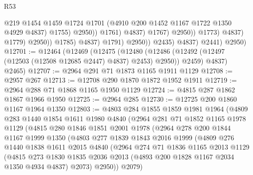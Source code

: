 \begin{lexlean}{R53}
\begin{coremodule}
                                                @219
                                                @1454
                                                @1459
                                                @1724
                                                @1701
                                                (@4910 @200 @1452 @1167 @1722 @1350 @4929 @4837)
                                                @1755)
                                              @2950))
                                          @1761)
                                        @4837)
                                      @1767)
                                    @2950))
                                @1773)
                              @4837)
                            @1779)
                          @2950))
                      @1785)
                    @4837)
                  @1791)
                @2950))
            @2435)
          @4837)
        @2441)
      @2950)
@12701 := @12464
    (@12469
      (@12475
        (@12480 (@12486 (@12492 (@12497 (@12503 (@12508 @12685 @2447) @4837) @2453) @2950)) @2459)
        @4837)
      @2465)
@12707 := @2964 @291 @71 @1873 @1165 @1911 @1129
@12708 := @2957 @267
@12713 := @12708 @290 @1870 @1872 @1952 @1911
@12719 := @2964 @288 @71 @1868 @1165 @1950 @1129
@12724 := @4815 @287 @1862 @1867 @1966 @1950
@12725 := @2964 @285
@12730 := @12725 @200 @1860 @1167 @1964 @1350
@12803 := @4803
    @284
    @1855
    @1859
    @1981
    @1964
    (@4809
      @283
      @1440
      @1854
      @1611
      @1980
      @4840
      (@2964
        @281
        @71
        @1852
        @1165
        @1978
        @1129
        (@4815
          @280
          @1846
          @1851
          @2001
          @1978
          (@2964
            @278
            @200
            @1844
            @1167
            @1999
            @1350
            (@4803
              @277
              @1839
              @1843
              @2016
              @1999
              (@4809
                @276
                @1440
                @1838
                @1611
                @2015
                @4840
                (@2964
                  @274
                  @71
                  @1836
                  @1165
                  @2013
                  @1129
                  (@4815
                    @273
                    @1830
                    @1835
                    @2036
                    @2013
                    (@4893 @200 @1828 @1167 @2034 @1350 @4934 @4837)
                    @2073)
                  @2950))
              @2079)

\end{coremodule}
\end{lexlean}

